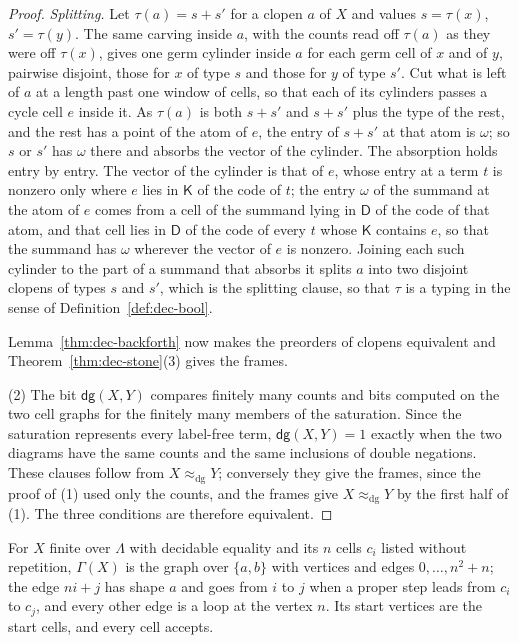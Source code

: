\documentclass{lmcs}
\theoremstyle{definition}
\theoremstyle{remark}
\newcommand{\ab}{\{a,b\}}
\providecommand{\eqDg}{\approx_{\mathrm{dg}}}
\providecommand{\KK}{\mathsf{K}}
\providecommand{\DD}{\mathsf{D}}
\providecommand{\dgB}{\mathsf{dg}}
\providecommand{\grph}[1]{\Gamma(#1)}
\begin{document}
\begin{proof}
\emph{Splitting.} Let $\tau(a)=s+s'$ for a clopen $a$ of $X$ and values $s=\tau(x)$, $s'=\tau(y)$. The same carving
inside $a$, with the counts read off $\tau(a)$ as they were off $\tau(x)$, gives one germ cylinder inside $a$ for each germ
cell of $x$ and of $y$, pairwise disjoint, those for $x$ of type $s$ and those for $y$ of type
$s'$. Cut what is left of $a$ at a length past one
window of cells, so that each of its cylinders passes a cycle cell $e$ inside it. As
$\tau(a)$ is both $s+s'$ and $s+s'$ plus the type of the rest, and the rest has a point of the atom of $e$, the entry of
$s+s'$ at that atom is $\omega$; so $s$ or $s'$ has $\omega$ there and absorbs the vector of the
cylinder. The absorption holds entry by entry. The vector of the
cylinder is that of $e$, whose entry at a term $t$ is nonzero only where $e$ lies in $\KK$ of the code of
$t$; the entry $\omega$ of the summand at the atom of $e$ comes
from a cell of the summand lying in $\DD$ of the code of that atom,
and that cell lies in $\DD$ of the code of every $t$ whose $\KK$ contains $e$, so that
the summand has $\omega$ wherever the vector of $e$ is nonzero. Joining each such cylinder to the part of a summand that
absorbs it splits $a$ into two disjoint clopens of types $s$ and $s'$, which is the splitting clause, so that $\tau$ is a
typing in the sense of Definition~\ref{def:dec-bool}.

Lemma~\ref{thm:dec-backforth} now makes the preorders of clopens equivalent and Theorem~\ref{thm:dec-stone}(3) gives
the frames.

(2) The bit $\dgB(X,Y)$ compares finitely many counts and bits computed on the two cell graphs for the finitely many
members of the saturation. Since the saturation represents every label-free term, $\dgB(X,Y)=1$ exactly when the
two diagrams have the same counts and the same inclusions of double negations. These
clauses follow from $X\eqDg Y$; conversely they give the frames, since the proof of (1) used only the counts, and the
frames give $X\eqDg Y$ by the first half of (1). The three conditions are therefore
equivalent.
\end{proof}

For $X$ finite over $\Lambda$ with decidable equality and its $n$ cells $c_i$
listed without repetition, $\grph{X}$ is the graph over $\ab$ with vertices and edges $0,\dots,n^2+n$; the edge $ni+j$
has shape $a$ and goes from $i$ to $j$ when a proper step leads from $c_i$ to $c_j$, and every other edge is a loop at
the vertex $n$. Its start vertices are the start cells, and every cell accepts.
\end{document}
